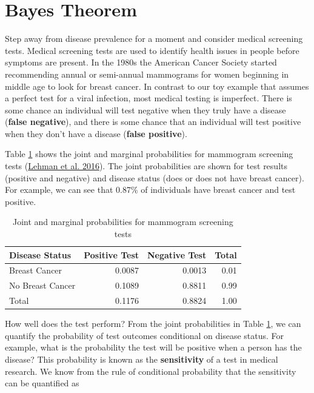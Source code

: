 \documentclass[
]{book}
\begin{document}
\section{Bayes Theorem}\label{bayes-theorem}

Step away from disease prevalence for a moment and consider medical
screening tests. Medical screening tests are used to identify health
issues in people before symptoms are present. In the 1980s the American
Cancer Society started recommending annual or semi-annual mammograms for
women beginning in middle age to look for breast cancer. In contrast to
our toy example that assumes a perfect test for a viral infection, most
medical testing is imperfect. There is some chance an individual will
test negative when they truly have a disease (\textbf{false negative}), and
there is some chance that an individual will test positive when they
don't have a disease (\textbf{false positive}).

Table \ref{tab:c07c11} shows the joint and marginal probabilities for
mammogram screening tests (\href{https://pubs.rsna.org/doi/10.1148/radiol.2016161174}{Lehman et al.
2016}). The joint
probabilities are shown for test results (positive and negative) and
disease status (does or does not have breast cancer). For example, we
can see that 0.87\% of individuals have breast cancer and test positive.

\begin{table}
\centering
\caption{\label{tab:c07c11}Joint and marginal probabilities for mammogram screening tests}
\centering
\begin{tabular}[t]{l|r|r|r}
\hline
Disease Status & Positive Test & Negative Test & Total\\
\hline
Breast Cancer & 0.0087 & 0.0013 & 0.01\\
\hline
No Breast Cancer & 0.1089 & 0.8811 & 0.99\\
\hline
Total & 0.1176 & 0.8824 & 1.00\\
\hline
\end{tabular}
\end{table}

How well does the test perform? From the joint probabilities in Table
\ref{tab:c07c11}, we can quantify the probability of test outcomes
conditional on disease status. For example, what is the probability the
test will be positive when a person has the disease? This probability is
known as the \textbf{sensitivity} of a test in medical research. We know from
the rule of conditional probability that the sensitivity can be
quantified as
\end{document}
